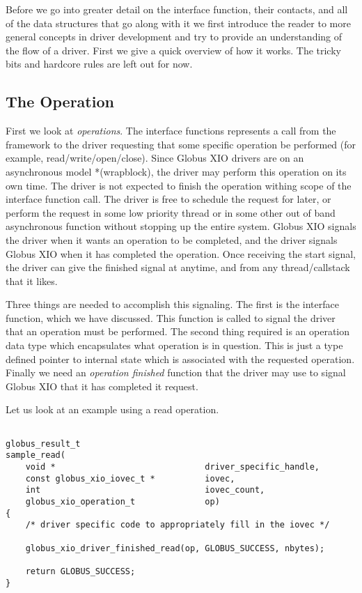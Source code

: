 \documentclass[11pt]{article}
\begin{document}
Before we go into greater detail on the interface function, their contacts,
and all of the data structures that go along with it we first introduce
the reader to more general concepts in driver development and try to 
provide an understanding of the flow of a driver.
First we give a quick overview of how it works.  
The tricky bits and hardcore rules are left out for now.

\subsection{The Operation}
First we look at \emph{operations}.  The interface functions
represents a call from the framework to the driver requesting that some
specific operation be performed (for example, read/write/open/close).  
Since Globus XIO drivers are on an 
asynchronous model *(wrapblock), the driver may perform 
this operation on its own time.  The driver
is not expected to finish the operation withing scope of the interface
function call.  The driver is free to schedule the request for later, 
or perform the request in some low priority thread or in some other out
of band asynchronous function without stopping up the entire system.
Globus XIO signals the driver when it wants an operation
to be completed, and the driver signals Globus XIO when it has 
completed the operation.  Once receiving the start signal, the driver
can give the finished signal at anytime, and from any thread/callstack
that it likes.

Three things are needed to accomplish this signaling.  The first is the
interface function, which we have discussed.  This function is called
to signal the driver that an operation must be performed.  The second
thing required is an operation data type which encapsulates what operation
is in question.  This is just a type defined pointer to internal state
which is associated with the requested operation.  Finally we need 
an \emph{operation finished} function that the driver
may use to signal Globus XIO that it has completed it request.

Let us look at an example using a read operation.

\begin{verbatim}

globus_result_t
sample_read(
    void *                              driver_specific_handle,
    const globus_xio_iovec_t *          iovec,
    int                                 iovec_count,
    globus_xio_operation_t              op)
{
    /* driver specific code to appropriately fill in the iovec */

    globus_xio_driver_finished_read(op, GLOBUS_SUCCESS, nbytes);

    return GLOBUS_SUCCESS;
}

\end{verbatim}
\end{document}
